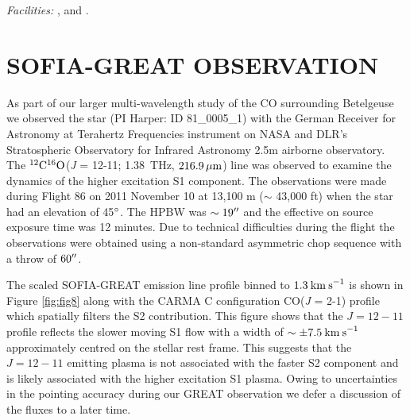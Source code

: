 \documentclass[iop]{emulateapj}
\begin{document}
{\it Facilities:} ,  and .



\appendix
\section{SOFIA-GREAT OBSERVATION}
As part of our larger multi-wavelength study of the CO surrounding Betelgeuse we observed the star (PI Harper: ID 81\_0005\_1) with the German Receiver for Astronomy at Terahertz Frequencies \cite[GREAT;][]{2000SPIE.4014...23G} instrument on NASA and DLR's Stratospheric Observatory for Infrared Astronomy \cite[SOFIA;][]{2009ASPC..417..101B} 2.5m airborne observatory. The $\rm{^{12}C{}^{16}O}$(\textit{J} = 12-11; 1.38~THz, $216.9\,\rm \mu m$) line was observed to examine the dynamics of the higher excitation S1 component. The observations were made during Flight 86 on 2011 November 10 at 13,100 m ($\sim$ 43,000 ft) when the star had an elevation of 45$\mbox{$^\circ$}$. The HPBW was $\sim 19\mbox{$^{\prime\prime}$}$ and the effective on source exposure time was 12 minutes. Due to technical difficulties during the flight the observations were obtained using a non-standard asymmetric chop sequence with a throw of $60\mbox{$^{\prime\prime}$}$.

The scaled SOFIA-GREAT emission line profile binned to $1.3\>{\rm km\>s}^{-1}$ is shown in Figure \ref{fig:fig8} along with the CARMA C configuration CO(\textit{J} = 2-1) profile which spatially filters the S2 contribution. This figure shows that the $\textit{J} = 12-11$ profile reflects the slower moving S1 flow with a width of $\sim \pm 7.5\>{\rm km\>s}^{-1}$ approximately centred on the stellar rest frame. This suggests that the $\textit{J} = 12-11$ emitting plasma is not associated with the faster S2 component and is likely associated with the higher excitation S1 plasma. Owing to uncertainties in the pointing accuracy during our GREAT observation we defer a discussion of the fluxes to a later time. 
\end{document}
